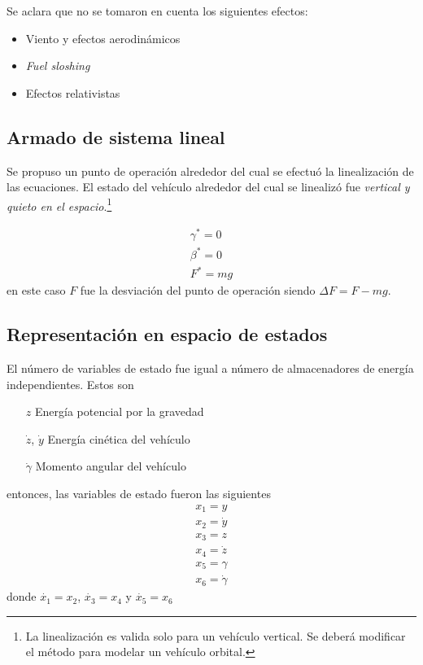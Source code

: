 Se aclara que no se tomaron en cuenta los siguientes efectos:
\begin{itemize}
	\item Viento y efectos aerodinámicos
	\item \textit{Fuel sloshing}
	\item Efectos relativistas
\end{itemize}

\subsection{Armado de sistema lineal}

Se propuso un punto de operación alrededor del cual se efectuó la linealización de las ecuaciones. El estado del vehículo alrededor del cual se linealizó fue \textit{vertical y quieto en el espacio}.\footnote{La linealización es valida solo para un vehículo vertical. Se deberá modificar el método para modelar un vehículo orbital.} 

\begin{align*}
	\gamma^* = 0 \\
	\beta^* = 0 \\
	F^* = mg
\end{align*}
en este caso $F$ fue la desviación del punto de operación siendo $\Delta F = F- mg$.

\subsection{Representación en espacio de estados}
El número de variables de estado fue igual a número de almacenadores de energía independientes. Estos son

\begin{enumerate}
	\item[$z$] Energía potencial por la gravedad
	\item[$\dot{z}$,] $\dot{y}$  Energía cinética del vehículo
	\item[$\dot{\gamma}$] Momento angular del vehículo
\end{enumerate}
entonces, las variables de estado fueron las siguientes
\begin{align*}
	x_1 = y \\
	x_2 = \dot{y} \\
	x_3 = z \\
	x_4 = \dot{z} \\
	x_5 = \gamma \\
	x_6 = \dot{\gamma}
\end{align*}
donde $\dot{x_1} = x_2$, $\dot{x_3} = x_4$ y $\dot{x_5} = x_6$

